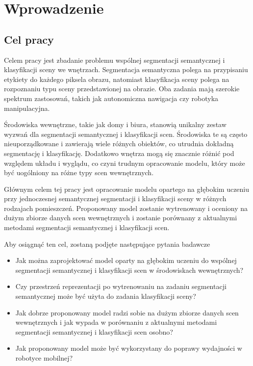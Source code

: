 \newpage %
\section{Wprowadzenie}

\subsection{Cel pracy}
Celem pracy jest zbadanie problemu wspólnej segmentacji semantycznej i klasyfikacji sceny we wnętrzach. Segmentacja semantyczna polega na przypisaniu etykiety do każdego piksela obrazu, natomiast klasyfikacja sceny polega na rozpoznaniu typu sceny przedstawionej na obrazie. Oba zadania mają szerokie spektrum zastosowań, takich jak autonomiczna nawigacja czy robotyka manipulacyjna.

Środowiska wewnętrzne, takie jak domy i biura, stanowią unikalny zestaw wyzwań dla segmentacji semantycznej i klasyfikacji scen. Środowiska te są często nieuporządkowane i zawierają wiele różnych obiektów, co utrudnia dokładną segmentację i klasyfikację. Dodatkowo wnętrza mogą się znacznie różnić pod względem układu i wyglądu, co czyni trudnym opracowanie modelu, który może być uogólniony na różne typy scen wewnętrznych.

Głównym celem tej pracy jest opracowanie modelu opartego na głębokim uczeniu przy jednoczesnej semantycznej segmentacji i klasyfikacji sceny w różnych rodzajach pomieszczeń. Proponowany model zostanie wytrenowany i oceniony na dużym zbiorze danych scen wewnętrznych i zostanie porównany z aktualnymi metodami segmentacji semantycznej i klasyfikacji scen.

Aby osiągnąć ten cel, zostaną podjęte następujące pytania badawcze
\begin{itemize}
    \item Jak można zaprojektować model oparty na głębokim uczeniu do wspólnej segmentacji semantycznej i klasyfikacji scen w środowiskach wewnętrznych?
    \item Czy przestrzeń reprezentacji po wytrenowaniu na zadaniu segmentacji semantycznej może być użyta do zadania klasyfikacji sceny?
    \item Jak dobrze proponowany model radzi sobie na dużym zbiorze danych scen wewnętrznych i jak wypada w porównaniu z aktualnymi metodami segmentacji semantycznej i klasyfikacji scen osobno?
    \item Jak proponowany model może być wykorzystany do poprawy wydajności w robotyce mobilnej?
\end{itemize}

